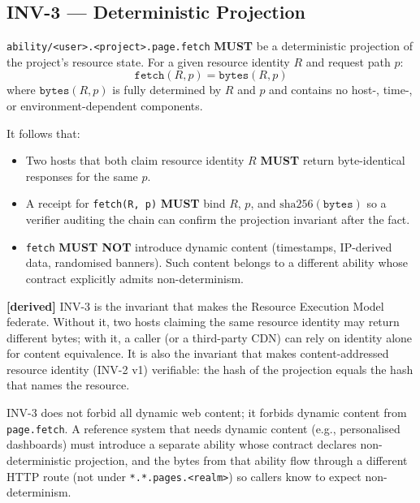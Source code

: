 \documentclass[11pt,a4paper]{article}
\newcommand{\derived}{\textcolor{derivedcolor}{\textbf{[derived]}}\xspace}
\theoremstyle{definition}
\begin{document}
\subsection{INV-3 --- Deterministic Projection}

\begin{invariant}
\texttt{ability/<user>.<project>.page.fetch} \textbf{MUST} be a
deterministic projection of the project's resource state. For
a given resource identity \(R\) and request path \(p\):
\[
    \texttt{fetch}(R, p) = \texttt{bytes}(R, p)
\]
where \(\texttt{bytes}(R, p)\) is fully determined by \(R\) and
\(p\) and contains no host-, time-, or environment-dependent
components.

\noindent It follows that:
\begin{itemize}[leftmargin=2em,itemsep=0.1em]
    \item Two hosts that both claim resource identity \(R\)
    \textbf{MUST} return byte-identical responses for the same
    \(p\).
    \item A receipt for \texttt{fetch(R, p)} \textbf{MUST}
    bind \(R\), \(p\), and \(\text{sha256}(\texttt{bytes})\)
    so a verifier auditing the chain can confirm the projection
    invariant after the fact.
    \item \texttt{fetch} \textbf{MUST NOT} introduce dynamic
    content (timestamps, IP-derived data, randomised banners).
    Such content belongs to a different ability whose contract
    explicitly admits non-determinism.
\end{itemize}
\end{invariant}

\derived{} INV-3 is the invariant that makes the Resource
Execution Model federate. Without it, two hosts claiming the
same resource identity may return different bytes; with it, a
caller (or a third-party CDN) can rely on identity alone for
content equivalence. It is also the invariant that makes
content-addressed resource identity (INV-2 v1) verifiable: the
hash of the projection equals the hash that names the resource.

\begin{notebox}
INV-3 does not forbid all dynamic web content; it forbids
dynamic content from \texttt{page.fetch}. A reference system
that needs dynamic content (e.g., personalised dashboards) must
introduce a separate ability whose contract declares
non-deterministic projection, and the bytes from that ability
flow through a different HTTP route (not under
\texttt{*.*.pages.<realm>}) so callers know to expect
non-determinism.
\end{notebox}
\end{document}
